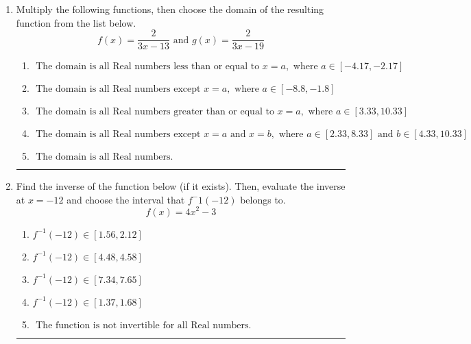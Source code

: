 \documentclass[14pt]{extbook}
\newcommand{\litem}[1]{\item#1\hspace*{-1cm}\rule{\textwidth}{0.4pt}}
\begin{document}
\begin{enumerate}
{\begin{enumerate}[label=\Alph*.]
\end{enumerate} }
\litem{
Multiply the following functions, then choose the domain of the resulting function from the list below.\[ f(x) = \frac{2}{3x-13} \text{ and } g(x) = \frac{2}{3x-19} \]\begin{enumerate}[label=\Alph*.]
\item \( \text{ The domain is all Real numbers less than or equal to } x = a, \text{ where } a \in [-4.17, -2.17] \)
\item \( \text{ The domain is all Real numbers except } x = a, \text{ where } a \in [-8.8, -1.8] \)
\item \( \text{ The domain is all Real numbers greater than or equal to } x = a, \text{ where } a \in [3.33, 10.33] \)
\item \( \text{ The domain is all Real numbers except } x = a \text{ and } x = b, \text{ where } a \in [2.33, 8.33] \text{ and } b \in [4.33, 10.33] \)
\item \( \text{ The domain is all Real numbers. } \)

\end{enumerate} }
\litem{
Find the inverse of the function below (if it exists). Then, evaluate the inverse at $x = -12$ and choose the interval that $f^-1(-12)$ belongs to.\[ f(x) = 4 x^2 - 3 \]\begin{enumerate}[label=\Alph*.]
\item \( f^{-1}(-12) \in [1.56, 2.12] \)
\item \( f^{-1}(-12) \in [4.48, 4.58] \)
\item \( f^{-1}(-12) \in [7.34, 7.65] \)
\item \( f^{-1}(-12) \in [1.37, 1.68] \)
\item \( \text{ The function is not invertible for all Real numbers. } \)

\end{enumerate} }
\end{enumerate}
\end{document}
